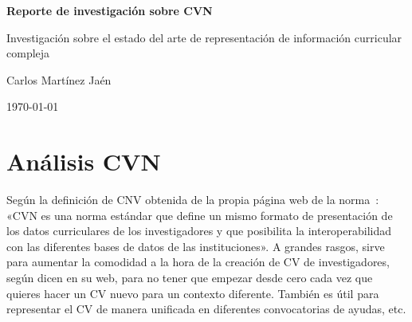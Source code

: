 \documentclass[12pt,a4paper]{article}
\begin{document}
\begin{titlepage}
  \centering
  \vspace*{0.35\textheight}
  {\LARGE\bfseries Reporte de investigación sobre CVN\par}
  \vspace{0.75em}
  {\large Investigación sobre el estado del arte de representación de información curricular compleja\par}
  \vspace{1.5em}
  {\large Carlos Martínez Jaén\par}
  \vspace{0.75em}

  {\large \today\par}
\end{titlepage}

\tableofcontents
\clearpage

\begin{abstract}
Este reporte investiga el estado del arte en la representación de información curricular compleja, partiendo de un análisis exhaustivo del estándar español CVN. Se evalúan diversos modelos conceptuales (CERIF, VIVO, ROH), formatos de serialización (XML, JSON, YAML) y soluciones híbridas (LinkML), determinando que las opciones basadas en la Web Semántica presentan una complejidad técnica desproporcionada para el alcance del trabajo. Como alternativa óptima, se propone un enfoque de modelado agnóstico basado en UML y OCL para definir el marco conceptual de los datos, utilizando la herramienta BESSER para transformar automáticamente estos modelos en clases validadoras de Pydantic.
\end{abstract}

\section{Análisis CVN}

Según la definición de CNV obtenida de la propia página web de la norma~\cite{cvn_web}: «CVN es una norma estándar que define un mismo formato de presentación de los datos curriculares de los investigadores y que posibilita la interoperabilidad con las diferentes bases de datos de las instituciones». A grandes rasgos, sirve para aumentar la comodidad a la hora de la creación de CV de investigadores, según dicen en su web, para no tener que empezar desde cero cada vez que quieres hacer un CV nuevo para un contexto diferente. También es útil para representar el CV de manera unificada en diferentes convocatorias de ayudas, etc.
\end{document}
